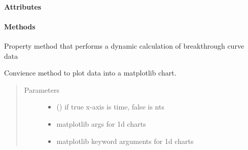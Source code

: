 \documentclass[letterpaper,10pt,english]{sphinxmanual}
\begin{document}
\begin{fulllineitems}
\begin{quote}
\begin{description}
\begin{itemize}
\end{itemize}

\end{description}\end{quote}
\paragraph{Attributes}
\paragraph{Methods}

\begin{fulllineitems}
\label{\detokenize{index:lb_colloids.Colloids.Colloid_output.Breakthrough.breakthrough_curve}}
Property method that performs a dynamic
calculation of breakthrough curve data

\end{fulllineitems}


\begin{fulllineitems}
\label{\detokenize{index:lb_colloids.Colloids.Colloid_output.Breakthrough.plot}}
Convience method to plot data into a matplotlib
chart.
\begin{quote}\begin{description}
\item[{Parameters}] \leavevmode\begin{itemize}
\item {} 
 () \textendash{} if true x-axis is time, false is nts

\item {} 
 \textendash{} 
matplotlib args for 1d charts


\item {} 
 \textendash{} 
matplotlib keyword arguments for 1d charts


\end{itemize}

\end{description}\end{quote}


\end{fulllineitems}
\end{fulllineitems}
\end{document}
